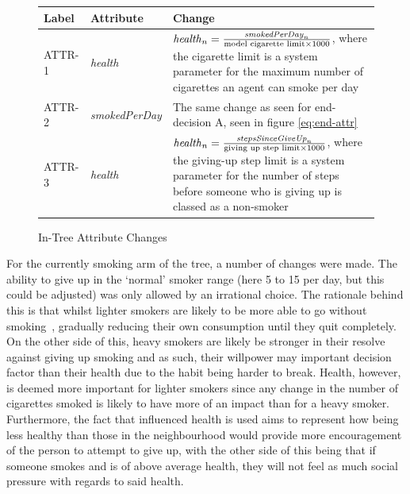 \documentclass[]{report}
\begin{document}
\begin{figure}
\begin{center}
\label{tab:attr-change}
\begin{tabular}{|l||l|p{10cm}|}
\hline
\bf{Label} & \bf{Attribute} & \bf{Change}\\
\hline
ATTR-1 	& \emph{health} 				&	$\text{\emph{health}}_{n} = \frac{\text{\emph{smokedPerDay}}_{n}}{\text{model cigarette limit} \times 1000}$, where the cigarette limit is a system parameter for the maximum number of cigarettes an agent can smoke per day		\\
ATTR-2	&	\emph{smokedPerDay}  	&	The same change as seen for end-decision A, seen in figure \ref{eq:end-attr}				\\
ATTR-3	&	\emph{health}					&	$\text{\emph{health}}_{n} = \frac{\text{\emph{stepsSinceGiveUp}}_{n}}{\text{giving up step limit} \times 1000}$, where the giving-up step limit is a system parameter for the number of steps before someone who is giving up is classed as a non-smoker \\
\hline

\end{tabular}
\end{center}
\caption{In-Tree Attribute Changes}
\end{figure}
For the currently smoking arm of the tree, a number of changes were made. The ability to give up in the `normal' smoker range (here 5 to 15 per day, but this could be adjusted) was only allowed by an irrational choice. The rationale behind this is that whilst lighter smokers are likely to be more able to go without smoking~\cite{NHS-43}, gradually reducing their own consumption until they quit completely. On the other side of this, heavy smokers are likely be stronger in their resolve against giving up smoking and as such, their willpower may important decision factor than their health due to the habit being harder to break. Health, however, is deemed more important for lighter smokers since any change in the number of cigarettes smoked is likely to have more of an impact than for a heavy smoker. Furthermore, the fact that influenced health is used aims to represent how being less healthy than those in the neighbourhood would provide more encouragement of the person to attempt to give up, with the other side of this being that if someone smokes and is of above average health, they will not feel as much social pressure with regards to said health.
\end{document}
